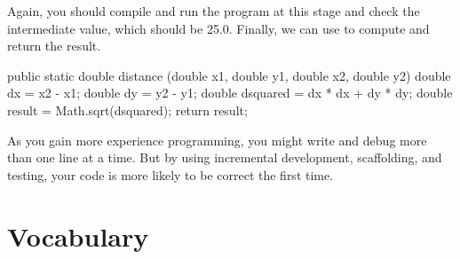 Again, you should compile and run the program at this stage and check the intermediate value, which should be 25.0.
Finally, we can use  to compute and return the result.

\begin{code}
public static double distance
        (double x1, double y1, double x2, double y2) {
    double dx = x2 - x1;
    double dy = y2 - y1;
    double dsquared = dx * dx + dy * dy;
    double result = Math.sqrt(dsquared);
    return result;
}
\end{code}


As you gain more experience programming, you might write and debug more than one line at a time.
But by using incremental development, scaffolding, and testing, your code is more likely to be correct the first time.


\section{Vocabulary}

